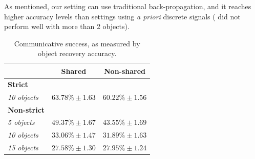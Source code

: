 \documentclass[11pt,a4paper]{article}
\newcommand{\nbEC}[1]{{\leavevmode\color{blue}{\scriptsize#1}}}
\begin{document}
As mentioned, our setting can use traditional back-propagation, and it reaches higher accuracy levels than settings using \emph{a priori} discrete signals (\citealp{REF} did not perform well with more than 2 objects\nbEC{CHECK}).
\nbEC{Move this paragraph to discussion section?}


\begin{table}[]
\begin{tabular}{lcc}
\hline
                       & \textbf{Shared} & \textbf{Non-shared} \\ \hline
\textbf{Strict} & \\
\emph{10 objects} & 
	$63.78\%\pm 1.63$  & $60.22\%\pm 1.56$      \\\hline
\textbf{Non-strict} & \\
\emph{5 objects} &
	$49.37\%\pm 1.67$  & $43.55\%\pm 1.69$      \\
\emph{10 objects} &
	$33.06\%\pm 1.47$  & $31.89\%\pm 1.63$      \\
\emph{15 objects} &
	$27.58\%\pm 1.30$  & $27.95\%\pm 1.24$      \\ \hline
\end{tabular}
\caption{Communicative success, as measured by object recovery accuracy.}\label{tab:object_prediction_accuracy}
\end{table}

\end{document}
